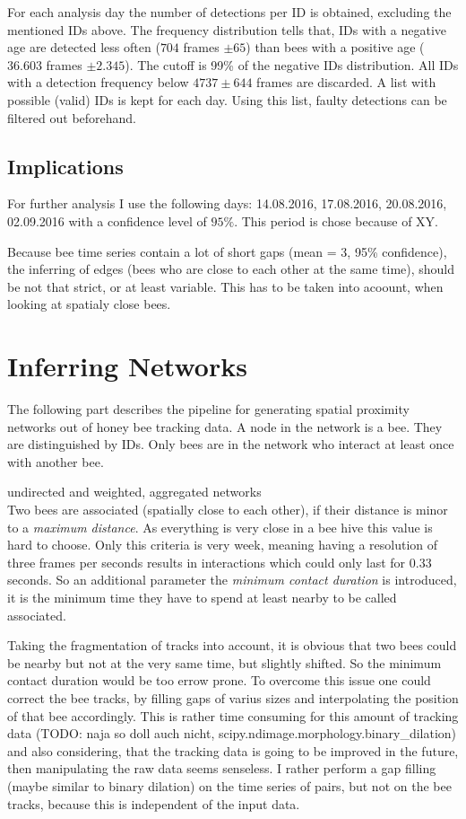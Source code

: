 For each analysis day the number of detections per ID is obtained, excluding the mentioned IDs above. The frequency distribution tells that, IDs with a negative age are detected less often ($704$ frames $\pm 65$)  than bees with a positive age ($36.603$ frames $\pm 2.345$). The cutoff is 99\% of the negative IDs distribution. All IDs with a detection frequency below $4737 \pm 644$ frames are discarded. A list with possible (valid) IDs is kept for each day. Using this list, faulty detections can be filtered out beforehand.

\subsection{Implications}
For further analysis I use the following days: 14.08.2016, 17.08.2016, 20.08.2016, 02.09.2016 with a confidence level of $95\%$. This period is chose because of XY.

Because bee time series contain a lot of short gaps (mean = 3, 95\% confidence), the inferring of edges (bees who are close to each other at the same time), should be not that strict, or at least variable. This has to be taken into acoount, when looking at spatialy close bees.

\section{Inferring Networks}

The following part describes the pipeline for generating spatial proximity networks out of honey bee tracking data. A node in the network is a bee. They are distinguished by IDs. Only bees are in the network who interact at least once with another bee.

undirected and weighted, aggregated networks\\

Two bees are associated (spatially close to each other), if their distance is minor to a \emph{maximum distance}. As everything is very close in a bee hive this value is hard to choose. Only this criteria is very week, meaning having a resolution of three frames per seconds results in interactions which could only last for $0.33$ seconds. So an additional parameter the \emph{minimum contact duration} is introduced, it is the minimum time they have to spend at least nearby to be called associated.

Taking the fragmentation of tracks into account, it is obvious that two bees could be nearby but not at the very same time, but slightly shifted. So the minimum contact duration would be too errow prone. To overcome this issue one could correct the bee tracks, by filling gaps of varius sizes and interpolating the position of that bee accordingly. This is rather time consuming for this amount of tracking data (TODO: naja so doll auch nicht, scipy.ndimage.morphology.binary\_dilation) and also considering, that the tracking data is going to be improved in the future, then manipulating the raw data seems senseless. I rather perform a gap filling (maybe similar to binary dilation) on the time series of pairs, but not on the bee tracks, because this is independent of the input data.

